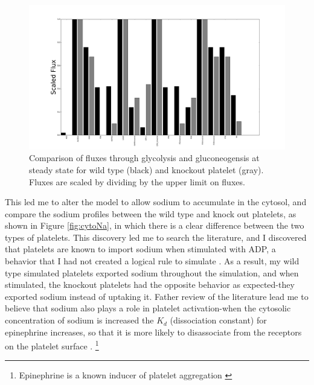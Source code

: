 \documentclass[11pt]{article}
\begin{document}
\begin{figure}
\centering
\hspace{-2cm}
\includegraphics[scale=.25]{../figures/barSSKnockouts[5742,5743]Glycolysis_Gluconeogenesis}
\caption{Comparison of fluxes through glycolysis and gluconeogensis at steady state for wild type (black) and knockout platelet (gray). Fluxes are scaled by dividing by the upper limit on fluxes.}
\label{fig:SSknockout}
\end{figure}
This led me to alter the model to allow sodium to accumulate in the cytosol, and compare the sodium profiles between the wild type and knock out platelets, as shown in Figure \ref{fig:cytoNa}, in which there is a clear difference between the two types of platelets. This discovery led me to search the literature, and I discovered that platelets are known to import sodium when stimulated with ADP, a behavior that I had not created a logical rule to simulate \cite{sage1991resting}. As a result, my wild type simulated platelets exported sodium throughout the simulation, and when stimulated, the knockout platelets had the opposite behavior as expected-they exported sodium instead of uptaking it. Father review of the literature lead me to believe that sodium also plays a role in platelet activation-when the cytosolic concentration of sodium is increased the $K_d$ (dissociation constant) for epinephrine increases, so that it is more likely to disassociate from the receptors on the platelet surface \cite{motulsky1983influence}. \footnote{Epinephrine is a known inducer of platelet aggregation \cite{spalding1998mechanism}}
\end{document}
